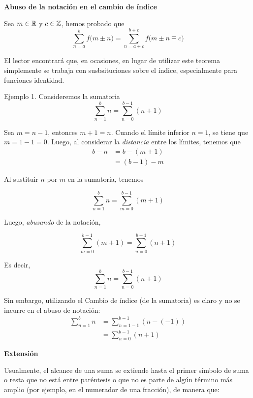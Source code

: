 \textbf{Abuso de la notación en el cambio de índice}

Sea $m\in \mathbb{R}$ y $c\in \mathbb{Z}$, hemos probado que \[\sum_{n=a}^{b}f\bigl(m\pm n\bigr) = \sum_{n=a+c}^{b+c}f\bigl(m\pm n \mp c\bigr)\]

El lector encontrará que, en ocasiones, en lugar de utilizar este teorema simplemente se trabaja con susbsituciones sobre el índice, especialmente para funciones identidad. 

Ejemplo 1. Consideremos la sumatoria
  \[\sum_{n=1}^{b} n = \sum_{n=0}^{b-1} (n+1)\]
  
  Sea $m=n-1$, entonces $m+1=n$. Cuando el límite inferior $n=1$, se tiene que $m=1-1=0$. Luego, al considerar la \textit{distancia} entre los límites, tenemos que
  \begin{align*}
    b - n &= b - (m+1)\\
    &= (b-1) - m
  \end{align*}
  
  Al sustituir $n$ por $m$ en la sumatoria, tenemos
  
  \[\sum_{n=1}^{b} n = \sum_{m=0}^{b-1} (m+1)\]
  
  Luego, \textit{abusando} de la notación, 
  
  \[\sum_{m=0}^{b-1} (m+1) = \sum_{n=0}^{b-1} (n+1)\]
  
  Es decir, \[\sum_{n=1}^{b} n = \sum_{n=0}^{b-1} (n+1)\]
  
  Sin embargo, utilizando el Cambio de índice (de la sumatoria) es claro y no se incurre en el abuso de notación:
  \begin{align*}
    \sum_{n=1}^{b} n &= \sum_{n=1-1}^{b-1} (n-(-1))\\
    &= \sum_{n=0}^{b-1} (n+1)
  \end{align*}
  
  

\textbf{Extensión}

Usualmente, el alcance de una suma se extiende hasta el primer símbolo de suma o resta que no está entre paréntesis o que no es parte de algún término más amplio (por ejemplo, en el numerador de una fracción), de manera que:

